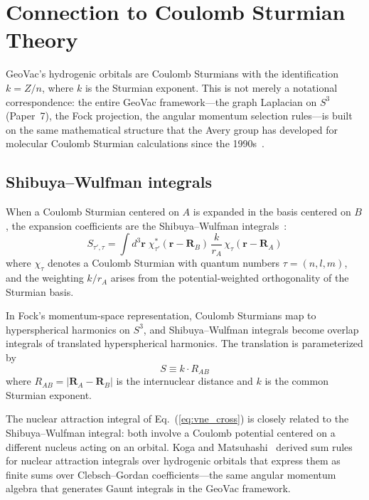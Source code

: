 \documentclass[aps,pra,twocolumn,superscriptaddress,longbibliography]{revtex4-2}
\begin{document}
\section{Connection to Coulomb Sturmian Theory}
\label{sec:sturmian}

GeoVac's hydrogenic orbitals are Coulomb Sturmians with the
identification $k = Z/n$, where $k$ is the Sturmian exponent.
This is not merely a notational correspondence: the entire GeoVac
framework---the graph Laplacian on $S^3$ (Paper~7), the Fock
projection, the angular momentum selection rules---is built on the
same mathematical structure that the Avery group has developed for
molecular Coulomb Sturmian calculations since the
1990s~\cite{avery2000,avery2004,avery2012,avery2014}.

\subsection{Shibuya--Wulfman integrals}

When a Coulomb Sturmian centered on $A$ is expanded in the basis
centered on $B$, the expansion coefficients are the Shibuya--Wulfman
integrals~\cite{shibuya1965}:
\begin{equation}
\label{eq:sw}
S_{\tau', \tau} = \int d^3\mathbf{r}\; \chi_{\tau'}^*(\mathbf{r} -
\mathbf{R}_B)\, \frac{k}{r_A}\, \chi_\tau(\mathbf{r} - \mathbf{R}_A)
\end{equation}
where $\chi_\tau$ denotes a Coulomb Sturmian with quantum numbers
$\tau = (n, l, m)$, and the weighting $k/r_A$ arises from the
potential-weighted orthogonality of the Sturmian basis.

In Fock's momentum-space representation, Coulomb Sturmians map to
hyperspherical harmonics on $S^3$, and Shibuya--Wulfman integrals
become overlap integrals of translated hyperspherical harmonics.
The translation is parameterized by
\begin{equation}
S \equiv k \cdot R_{AB}
\end{equation}
where $R_{AB} = |\mathbf{R}_A - \mathbf{R}_B|$ is the internuclear
distance and $k$ is the common Sturmian exponent.

The nuclear attraction integral of Eq.~(\ref{eq:vne_cross}) is
closely related to the Shibuya--Wulfman integral: both involve a
Coulomb potential centered on a different nucleus acting on an orbital.
Koga and Matsuhashi~\cite{koga1987} derived sum rules for nuclear
attraction integrals over hydrogenic orbitals that express them as
finite sums over Clebsch--Gordan coefficients---the same angular
momentum algebra that generates Gaunt integrals in the GeoVac
framework.
\end{document}
